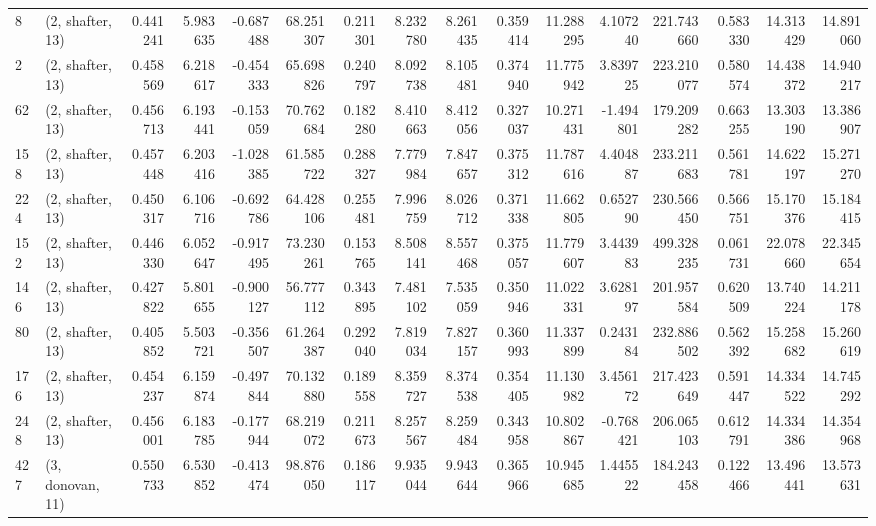 \begin{tabular}{llrrrrrrrrrrrrrr}
8   &  (2, shafter, 13) &   0.441241 &   5.983635 &  -0.687488 &    68.251307 &   0.211301 &   8.232780 &   8.261435 &  0.359414 &  11.288295 &   4.107240 &   221.743660 &  0.583330 &  14.313429 &  14.891060 \\
2   &  (2, shafter, 13) &   0.458569 &   6.218617 &  -0.454333 &    65.698826 &   0.240797 &   8.092738 &   8.105481 &  0.374940 &  11.775942 &   3.839725 &   223.210077 &  0.580574 &  14.438372 &  14.940217 \\
62  &  (2, shafter, 13) &   0.456713 &   6.193441 &  -0.153059 &    70.762684 &   0.182280 &   8.410663 &   8.412056 &  0.327037 &  10.271431 &  -1.494801 &   179.209282 &  0.663255 &  13.303190 &  13.386907 \\
158 &  (2, shafter, 13) &   0.457448 &   6.203416 &  -1.028385 &    61.585722 &   0.288327 &   7.779984 &   7.847657 &  0.375312 &  11.787616 &   4.404887 &   233.211683 &  0.561781 &  14.622197 &  15.271270 \\
224 &  (2, shafter, 13) &   0.450317 &   6.106716 &  -0.692786 &    64.428106 &   0.255481 &   7.996759 &   8.026712 &  0.371338 &  11.662805 &   0.652790 &   230.566450 &  0.566751 &  15.170376 &  15.184415 \\
152 &  (2, shafter, 13) &   0.446330 &   6.052647 &  -0.917495 &    73.230261 &   0.153765 &   8.508141 &   8.557468 &  0.375057 &  11.779607 &   3.443983 &   499.328235 &  0.061731 &  22.078660 &  22.345654 \\
146 &  (2, shafter, 13) &   0.427822 &   5.801655 &  -0.900127 &    56.777112 &   0.343895 &   7.481102 &   7.535059 &  0.350946 &  11.022331 &   3.628197 &   201.957584 &  0.620509 &  13.740224 &  14.211178 \\
80  &  (2, shafter, 13) &   0.405852 &   5.503721 &  -0.356507 &    61.264387 &   0.292040 &   7.819034 &   7.827157 &  0.360993 &  11.337899 &   0.243184 &   232.886502 &  0.562392 &  15.258682 &  15.260619 \\
176 &  (2, shafter, 13) &   0.454237 &   6.159874 &  -0.497844 &    70.132880 &   0.189558 &   8.359727 &   8.374538 &  0.354405 &  11.130982 &   3.456172 &   217.423649 &  0.591447 &  14.334522 &  14.745292 \\
248 &  (2, shafter, 13) &   0.456001 &   6.183785 &  -0.177944 &    68.219072 &   0.211673 &   8.257567 &   8.259484 &  0.343958 &  10.802867 &  -0.768421 &   206.065103 &  0.612791 &  14.334386 &  14.354968 \\
427 &  (3, donovan, 11) &   0.550733 &   6.530852 &  -0.413474 &    98.876050 &   0.186117 &   9.935044 &   9.943644 &  0.365966 &  10.945685 &   1.445522 &   184.243458 &  0.122466 &  13.496441 &  13.573631 \\

\end{tabular}
